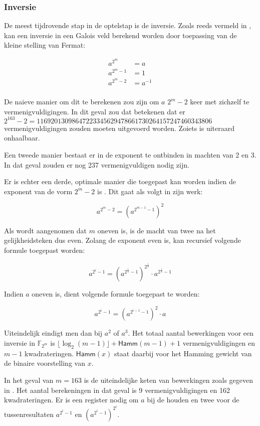 \subsubsection{Inversie}

De meest tijdrovende stap in de optelstap is de inversie.  Zoals reeds vermeld in , kan een inversie in een Galois veld berekend worden door toepassing van de kleine stelling van Fermat:

\[\begin{aligned}
a^{2^m}		&= a\\
a^{2^m - 1}	&= 1\\
a^{2^m - 2}	&= a^{-1}\\
\end{aligned}\]

De naieve manier om dit te berekenen zou zijn om $a$ $2^m - 2$ keer met zichzelf te vermenigvuldigingen. In dit geval zou dat betekenen dat er $2^{163} -2 = 11 692 013 098 647 223 345 629 478 661 730 264 157 247 460 343 806$ vermenigvuldigingen zouden moeten uitgevoerd worden. Zoiets is uiteraard onhaalbaar.

Een tweede manier bestaat er in de exponent te ontbinden in machten van 2 en 3. In dat geval zouden er nog 237 vermenigvuldigen nodig zijn.

Er is echter een derde, optimale manier die toegepast kan worden indien de exponent van de vorm $2^m - 2$ is \cite{batina-pkc}\cite{itoh}. Dit gaat als volgt in zijn werk:

\[a^{2^m - 2} = (a^{2^{m - 1} - 1})^2\]

Als wordt aangenomen dat $m$ oneven is, is de macht van twee na het gelijkheidsteken dus even. Zolang de exponent even is, kan recursief volgende formule toegepast worden:

\[a^{2^i - 1} = (a^{2^{\frac{i}{2}} - 1})^{2^{\frac{i}{2}}} \cdot a^{2^{\frac{i}{2}} - 1}\]

Indien $a$ oneven is, dient volgende formule toegepast te worden:

\[a^{2^i - 1} = (a^{2^{i - 1} - 1})^2 \cdot a\]

Uiteindelijk eindigt men dan bij $a^2$ of $a^3$. Het totaal aantal bewerkingen voor een inversie in $\mathbb{F}_{2^m}$ is $\lfloor\log_2(m - 1)\rfloor + \textsf{Hamm}(m - 1) + 1$ vermenigvuldigingen en $m - 1$ kwadrateringen. $\textsf{Hamm}(x)$ staat daarbij voor het Hamming gewicht van de binaire voorstelling van $x$.

In het geval van $m = 163$ is de uiteindelijke keten van bewerkingen zoals gegeven in . Het aantal berekeningen in dat geval is 9 vermenigvuldigingen en 162 kwadrateringen. Er is een register nodig om $a$ bij de houden en twee voor de tussenresultaten $a^{2^i - 1}$ en $(a^{2^i - 1})^{2^i}$.

